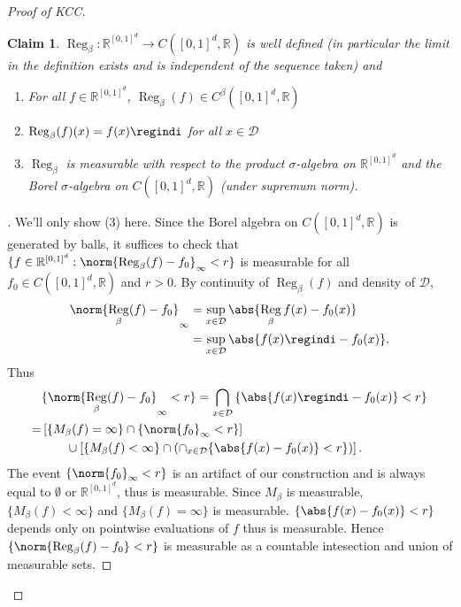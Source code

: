 \documentclass[fontsize=12pt, DIV=10]{scrreprt}
\newtheorem{claim}{Claim}
\theoremstyle{remark}
\newenvironment{subproof}[1][\proofname]{%
  \renewcommand{\qedsymbol}{$\blacksquare$}%
  \begin{proof}[#1]%
}{%
  \end{proof}%
}
\newcommand{\R}{\mathbb R}
\newcommand{\calD}{\mathcal D}
\DeclareMathOperator{\reg}{Reg}
\newcommand{\boxspace}{\ensuremath{\R^{[0, 1]^d}}}
\begin{document}
\begin{proof}[Proof of KCC]
\begin{claim}
		$\reg_{\beta}: \boxspace \to C([0, 1]^d, \R)$ is well defined (in particular the limit in the definition exists and is independent of the sequence taken) and 
		\begin{enumerate}
			\item For all $f \in \boxspace$, $\reg_{\beta}(f) \in C^{\beta}([0, 1]^d, \R)$
			\item $\reg_{\beta}(f)(x) = f(x) \regindi$ for all $x \in \calD$
			\item $\reg_{\beta}$ is measurable with respect to the product $\sigma$-algebra on $\boxspace$ and the Borel $\sigma$-algebra on $C([0, 1]^d, \R)$ (under supremum norm).
		\end{enumerate}
	\end{claim}
	\begin{subproof}
	We'll only show (3) here. Since the Borel algebra on $C([0, 1]^d, \R)$ is generated by balls, it suffices to check that $\{f \in \boxspace : \norm{\reg_{\beta}(f) - f_0}_{\infty} < r\}$ is measurable for all $f_0 \in C([0, 1]^d, \R)$ and $r > 0$. By continuity of $\reg_{\beta}(f)$ and density of $\calD$,
	\begin{align}
		\norm{\reg_{\beta}(f) - f_0}_{\infty}
		&= \sup_{x \in \calD} \abs{\reg_{\beta}f(x) - f_0(x)} \\
		&= \sup_{x \in \calD} \abs{f(x) \regindi - f_0(x)}.
	\end{align}
	Thus
	\begin{align}
		&\{\norm{\reg_{\beta}(f) - f_0}_{\infty} < r\}
		= \bigcap_{x \in \calD} \left\{ \abs{f(x) \regindi - f_0(x)} < r \right\} \\
		=& \left[ \{M_{\beta}(f) = \infty\} \cap \{\norm{f_0}_{\infty} < r\} \right] \nonumber \\
		 & \qquad \cup \left[ \{M_{\beta}(f) < \infty\} \cap \left( \cap_{x \in \calD} \{\abs{f(x) - f_0(x)} < r\} \right) \right].
	\end{align}
	The event $\{\norm{f_0}_{\infty} < r\}$ is an artifact of our construction and is always equal to $\emptyset$ or $\boxspace$, thus is measurable. Since $M_{\beta}$ is measurable, $\{M_{\beta}(f) < \infty\}$ and $\{M_{\beta}(f) = \infty\}$ is measurable. $\{\abs{f(x) - f_0(x)} < r\}$ depends only on pointwise evaluations of $f$ thus is measurable. Hence $\{\norm{\reg_{\beta}(f) - f_0} < r\}$ is measurable as a countable intesection and union of measurable sets.
	\end{subproof}


\end{proof}
\end{document}
